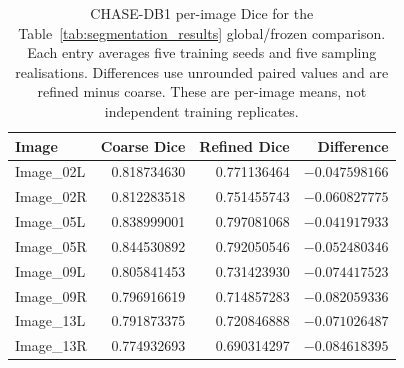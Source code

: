 \documentclass[jimaging,article,submit,pdftex,moreauthors]
  {Definitions/mdpi}
\begin{document}
\begin{table}[htbp]
\centering
\caption{CHASE-DB1 per-image Dice for the Table~\ref{tab:segmentation_results} global/frozen comparison. Each entry averages five training seeds and five sampling realisations. Differences use unrounded paired values and are refined minus coarse. These are per-image means, not independent training replicates.}
\label{tab:paired_per_image_chase}
\small
\begin{tabular}{lrrr}
\toprule
Image & Coarse Dice & Refined Dice & Difference \\
\midrule
Image\_02L & 0.818734630 & 0.771136464 & $-0.047598166$ \\
Image\_02R & 0.812283518 & 0.751455743 & $-0.060827775$ \\
Image\_05L & 0.838999001 & 0.797081068 & $-0.041917933$ \\
Image\_05R & 0.844530892 & 0.792050546 & $-0.052480346$ \\
Image\_09L & 0.805841453 & 0.731423930 & $-0.074417523$ \\
Image\_09R & 0.796916619 & 0.714857283 & $-0.082059336$ \\
Image\_13L & 0.791873375 & 0.720846888 & $-0.071026487$ \\
Image\_13R & 0.774932693 & 0.690314297 & $-0.084618395$ \\
\bottomrule
\end{tabular}
\end{table}
\end{document}
